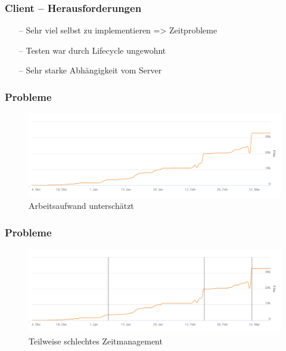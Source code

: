 \documentclass[aspectratio=1610]{beamer}
\begin{document}
\begin{frame}[plain]
      \frametitle{\textbf{Client} -- Herausforderungen}
	\begin{itemize}
		\item[--] Sehr viel selbst zu implementieren => Zeitprobleme
		\item[--] Testen war durch Lifecycle ungewohnt
		\item[--] Sehr starke Abhängigkeit vom Server
	\end{itemize}
  \end{frame}


    \begin{frame}[plain]
    	\frametitle{\textbf{Probleme}}
     	\begin{figure}
      		\includegraphics[width = \columnwidth - 30pt]{images/loc.png}
		\caption{Arbeitsaufwand unterschätzt}
    	\end{figure}
    \end{frame}

     \begin{frame}[plain]
    	\frametitle{\textbf{Probleme}}
     	\begin{figure}
      		\includegraphics[width = \columnwidth - 30pt]{images/loc_deadlines.png}
		\caption{Teilweise schlechtes Zeitmanagement}
    	\end{figure}
    \end{frame}
\end{document}
